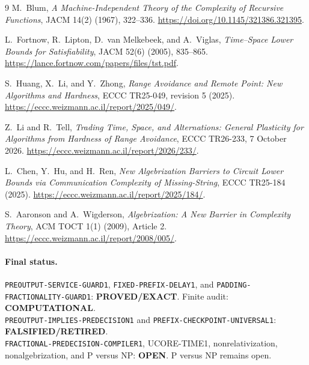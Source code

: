 \documentclass[11pt]{article}
\newcommand{\EXACT}{\textbf{PROVED/EXACT}}
\newcommand{\OPEN}{\textbf{OPEN}}
\newcommand{\RETIRED}{\textbf{FALSIFIED/RETIRED}}
\newcommand{\COMP}{\textbf{COMPUTATIONAL}}
\begin{document}
\begin{thebibliography}{9}
M.~Blum, \emph{A Machine-Independent Theory of the Complexity of Recursive
Functions}, JACM 14(2) (1967), 322--336.
\url{https://doi.org/10.1145/321386.321395}.

L.~Fortnow, R.~Lipton, D.~van Melkebeek, and A.~Viglas,
\emph{Time--Space Lower Bounds for Satisfiability}, JACM 52(6) (2005),
835--865. \url{https://lance.fortnow.com/papers/files/tst.pdf}.

S.~Huang, X.~Li, and Y.~Zhong,
\emph{Range Avoidance and Remote Point: New Algorithms and Hardness},
ECCC TR25-049, revision 5 (2025).
\url{https://eccc.weizmann.ac.il/report/2025/049/}.

Z.~Li and R.~Tell,
\emph{Trading Time, Space, and Alternations: General Plasticity for Algorithms
from Hardness of Range Avoidance}, ECCC TR26-233, 7 October 2026.
\url{https://eccc.weizmann.ac.il/report/2026/233/}.

L.~Chen, Y.~Hu, and H.~Ren,
\emph{New Algebrization Barriers to Circuit Lower Bounds via Communication
Complexity of Missing-String}, ECCC TR25-184 (2025).
\url{https://eccc.weizmann.ac.il/report/2025/184/}.

S.~Aaronson and A.~Wigderson,
\emph{Algebrization: A New Barrier in Complexity Theory}, ACM TOCT 1(1)
(2009), Article 2. \url{https://eccc.weizmann.ac.il/report/2008/005/}.
\end{thebibliography}

\paragraph{Final status.}
\nolinkurl{PREOUTPUT-SERVICE-GUARD1}, \nolinkurl{FIXED-PREFIX-DELAY1}, and
\nolinkurl{PADDING-FRACTIONALITY-GUARD1}: \EXACT.  Finite audit: \COMP.\\
\nolinkurl{PREOUTPUT-IMPLIES-PREDECISION1} and
\nolinkurl{PREFIX-CHECKPOINT-UNIVERSAL1}: \RETIRED.\\
\nolinkurl{FRACTIONAL-PREDECISION-COMPILER1}, UCORE-TIME1,
nonrelativization, nonalgebrization, and P versus NP: \OPEN.
P versus NP remains open.

\end{document}
